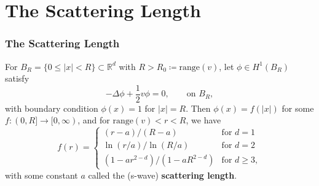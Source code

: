 \documentclass{beamer}[10]
\newcommand{\norm}[1]{\left\lVert #1 \right\rVert}
\newcommand{\abs}[1]{\left\lvert #1 \right\rvert}
\newcommand{\R}{\mathbb{R}}
\begin{document}
\section{The Scattering Length}

\begin{frame}
\frametitle{The Scattering Length}
	\small\begin{theorem}
		For $ B_R=\{0\leq\abs{x}<R\}\subset \R^d $ with $ R>R_0\coloneqq\text{range}(v) $, let $ \phi\in H^1(B_{R}) $ satisfy
	 \begin{equation}
		 -\Delta \phi +\frac12 v\phi=0,\qquad \text{on }B_R,
		 \end{equation}
		 with boundary condition $ \phi(x)=1 $ for $ \abs{x}=R$.
		 Then $ \phi(x)=f(\abs{x}) $ for some $ f:(0,R]\to [0,\infty) $, and for $ \text{range}(v)<r<R $, we have \begin{equation}
		 f(r)=\begin{cases}
		 (r-a)/(R-a) &\text{for }d=1\\
		 \ln(r/a)/\ln(R/a) &\text{for }d=2\\
		 (1-ar^{2-d})/(1-aR^{2-d})&\text{for }d\geq 3,
		 \end{cases}
		 \end{equation}
		 with some constant $ a $ called the (s-wave) \textbf{scattering length}.
	\end{theorem}
\end{frame}

\end{document}
